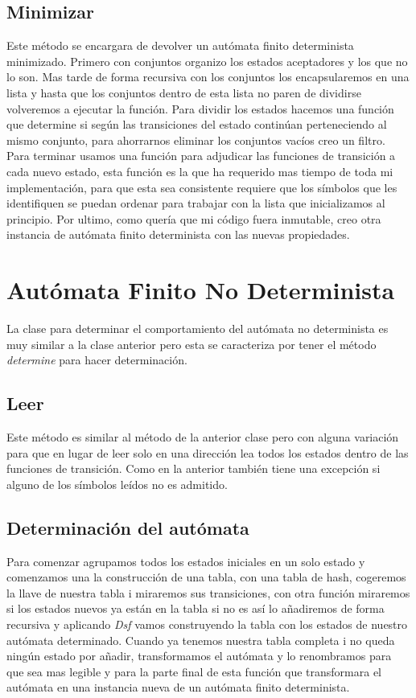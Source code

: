 \documentclass{article}
\begin{document}
    \subsection{Minimizar}\label{subsec:minimizar}
    Este método se encargara de devolver un autómata finito determinista minimizado.
    Primero con conjuntos organizo los estados aceptadores y los que no lo son.
    Mas tarde de forma recursiva con los conjuntos los encapsularemos en una lista y hasta que los conjuntos dentro de esta lista no paren de dividirse volveremos a ejecutar la función.
    Para dividir los estados hacemos una función que determine si según las transiciones del estado continúan perteneciendo al mismo conjunto, para ahorrarnos eliminar los conjuntos vacíos creo un filtro. Para terminar usamos una función para adjudicar las funciones de transición a cada nuevo estado, esta función es la que ha requerido mas tiempo de toda mi implementación, para que esta sea consistente requiere que los símbolos que les identifiquen se puedan ordenar para trabajar con la lista que inicializamos al principio.
    Por ultimo, como quería que mi código fuera inmutable, creo otra instancia de autómata  finito determinista con las nuevas propiedades.

    \section{Autómata Finito No Determinista}\label{sec:autómata-finito-no-determinista}
    La clase para determinar el comportamiento del autómata no determinista es muy similar a la clase anterior pero esta se caracteriza por tener el método  \textit{determine} para hacer determinación.

    \subsection{Leer}\label{subsec:leer}
    Este método es similar al método de la anterior clase pero con alguna variación para que en lugar de leer solo en una dirección lea todos los estados dentro de las funciones de transición. Como en la anterior también tiene una excepción si alguno de los símbolos leídos no es admitido.

    \subsection{Determinación del autómata}\label{subsec:determinación-del-autómata}
    Para comenzar agrupamos todos los estados iniciales en un solo estado y comenzamos una la construcción de una tabla, con una tabla de hash, cogeremos la llave de nuestra tabla i miraremos sus transiciones, con otra función miraremos si los estados nuevos ya están en la tabla si no es así lo añadiremos de forma recursiva y aplicando \textit{Dsf} vamos construyendo la tabla con los estados de nuestro autómata determinado. Cuando ya tenemos nuestra tabla completa i no queda ningún estado por añadir, transformamos el autómata y lo renombramos para que sea mas legible y para la parte final de esta función que transformara el autómata en una instancia nueva de un autómata finito determinista.
\end{document}
